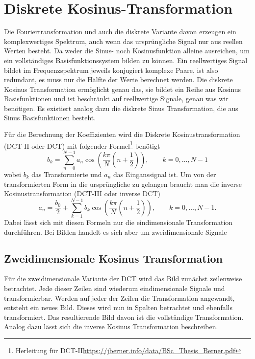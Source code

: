 %
%
%
%
\section{Diskrete Kosinus-Transformation
\label{jpeg:section:dct}}
Die Fouriertransformation und auch die diskrete Variante davon erzeugen ein komplexwertiges Spektrum, auch wenn das ursprüngliche Signal nur aus reellen Werten besteht.
Da weder die Sinus- noch Kosinusfunktion alleine ausreichen, um ein vollständiges Basisfunktionssystem bilden zu können.
Ein reellwertiges Signal bildet im Frequenzspektrum jeweils konjugiert komplexe Paare, ist also redundant, es muss nur die Hälfte der Werte berechnet werden.
Die diskrete Kosinus Transformation ermöglicht genau das, sie bildet ein Reihe aus Kosinus Basisfunktionen und ist beschränkt auf reellwertige Signale, genau was wir benötigen.
Es existiert analog dazu die diskrete Sinus Transformation, die aus Sinus Basisfunktionen besteht.

Für die Berechnung der Koeffizienten wird die Diskrete Kosinustransformation (DCT-II oder DCT) mit folgender Formel\footnote{Herleitung für DCT-II\url{https://jberner.info/data/BSc_Thesis_Berner.pdf}} benötigt 
\begin{equation}
    b_k
    =
    \sum \limits_{n=0}^{N-1} a_n 
    \cos\left(
        \frac{k\pi}{N}\left(n + \frac{1}{2} \right) 
    \right),
    \qquad k = 0,\dots,N-1
\label{jpeg:equationdct2}
\end{equation}
wobei \(b_k\) das Transformierte und \(a_n\) das Einganssignal ist.
Um von der transformierten Form in die ursprüngliche zu gelangen braucht man die inverse Kosinustransformation (DCT-III oder inverse DCT)
\begin{equation}
    a_n
    =
    \frac{b_0}{2} +
    \sum \limits_{k=1}^{N-1} b_k 
    \cos\left(
    \frac{k\pi}{N}\left(n + \frac{1}{2} \right) 
    \right),
    \qquad k = 0,\dots,N-1.
    \label{jpeg:equationdct3}
\end{equation}
Dabei lässt sich mit diesen Formeln nur die eindimensionale Transformation durchführen.
Bei Bilden handelt es sich aber um zweidimensionale Signale

\subsection{Zweidimensionale Kosinus Transformation
\label{jpeg:subsection:dctdim2}}
Für die zweidimensionale Variante der DCT wird das Bild zunächst zeilenweise betrachtet. Jede dieser Zeilen sind wiederum eindimensionale Signale und transformierbar.
Werden auf jeder der Zeilen die Transformation angewandt, entsteht ein neues Bild.
Dieses wird nun in Spalten betrachtet und ebenfalls transformiert.
Das resultierende Bild davon ist die vollständige Transformation.
Analog dazu lässt sich die inverse Kosinus Transformation beschreiben.

